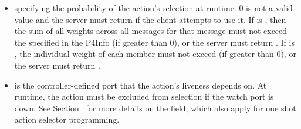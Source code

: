 \documentclass[11pt]{article}
\begin{document}
{\begin{itemize}
\item{}
 specifying the probability of the action's selection at runtime. 0 is
not a valid  value and the server must return  if
the client attempts to use it. If  is
, then the sum of all weights across all 
messages for that  message must not exceed the
 specified in the P4Info (if greater than 0), or the server
must return . If  is
, the individual weight of each member must not exceed
 (if greater than 0), or the server must return
.%

\item{}
 is the controller-defined port that the action's liveness depends
on. At runtime, the action must be excluded from selection if the watch port
is down. See Section~ for more details
on the  field, which also apply for one shot action selector
programming.%
\end{itemize}%

}
\end{document}

